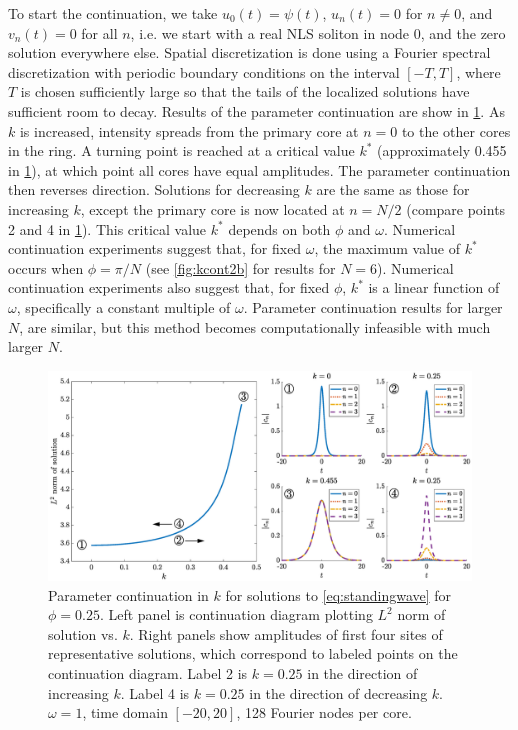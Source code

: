 \documentclass[11pt,reqno]{amsart}
\begin{document}
To start the continuation, we take $u_0(t) = \psi(t)$, $u_n(t) = 0$ for $n \neq 0$, and $v_n(t) = 0$ for all $n$, i.e. we start with a real NLS soliton in node 0, and the zero solution everywhere else. Spatial discretization is done using a Fourier spectral discretization with periodic boundary conditions on the interval $[-T,T]$, where $T$ is chosen sufficiently large so that the tails of the localized solutions have sufficient room to decay. Results of the parameter continuation are show in \cref{fig:kcont}. As $k$ is increased, intensity spreads from the primary core at $n=0$ to the other cores in the ring. A turning point is reached at a critical value $k^*$ (approximately 0.455 in \cref{fig:kcont}), at which point all cores have equal amplitudes. The parameter continuation then reverses direction. Solutions for decreasing $k$ are the same as those for increasing $k$, except the primary core is now located at $n=N/2$ (compare points 2 and 4 in \cref{fig:kcont}). This critical value $k^*$ depends on both $\phi$ and $\omega$. Numerical continuation experiments suggest that, for fixed $\omega$, the maximum value of $k^*$ occurs when $\phi = \pi/N$ (see \cref{fig:kcont2b} for results for $N=6$). Numerical continuation experiments also suggest that, for fixed $\phi$, $k^*$ is a linear function of $\omega$, specifically a constant multiple of $\omega$. Parameter continuation results for larger $N$, are similar, but this method becomes computationally infeasible with much larger $N$.

\begin{figure}
    \centering
    \includegraphics[width=16cm]{contdiag.eps}
    \caption{Parameter continuation in $k$ for solutions to \cref{eq:standingwave} for $\phi=0.25$. Left panel is continuation diagram plotting $L^2$ norm of solution vs. $k$. Right panels show amplitudes of first four sites of representative solutions, which correspond to labeled points on the continuation diagram. Label 2 is $k=0.25$ in the direction of increasing $k$. Label 4 is $k=0.25$ in the direction of decreasing $k$. $\omega=1$, time domain $[-20,20]$, 128 Fourier nodes per core.}
    \label{fig:kcont}
\end{figure}
\end{document}
